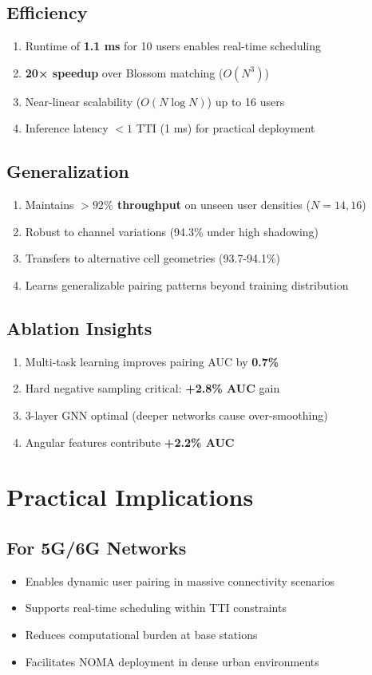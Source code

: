 \subsection{Efficiency}
\begin{enumerate}
    \item Runtime of \textbf{1.1 ms} for 10 users enables real-time scheduling
    \item \textbf{20× speedup} over Blossom matching ($O(N^3)$)
    \item Near-linear scalability ($O(N \log N)$) up to 16 users
    \item Inference latency $< 1$ TTI (1 ms) for practical deployment
\end{enumerate}

\subsection{Generalization}
\begin{enumerate}
    \item Maintains \textbf{$>92\%$ throughput} on unseen user densities ($N=14, 16$)
    \item Robust to channel variations (94.3\% under high shadowing)
    \item Transfers to alternative cell geometries (93.7-94.1\%)
    \item Learns generalizable pairing patterns beyond training distribution
\end{enumerate}

\subsection{Ablation Insights}
\begin{enumerate}
    \item Multi-task learning improves pairing AUC by \textbf{0.7\%}
    \item Hard negative sampling critical: \textbf{+2.8\% AUC} gain
    \item 3-layer GNN optimal (deeper networks cause over-smoothing)
    \item Angular features contribute \textbf{+2.2\% AUC}
\end{enumerate}

\section{Practical Implications}

\subsection{For 5G/6G Networks}
\begin{itemize}
    \item Enables dynamic user pairing in massive connectivity scenarios
    \item Supports real-time scheduling within TTI constraints
    \item Reduces computational burden at base stations
    \item Facilitates NOMA deployment in dense urban environments
\end{itemize}

